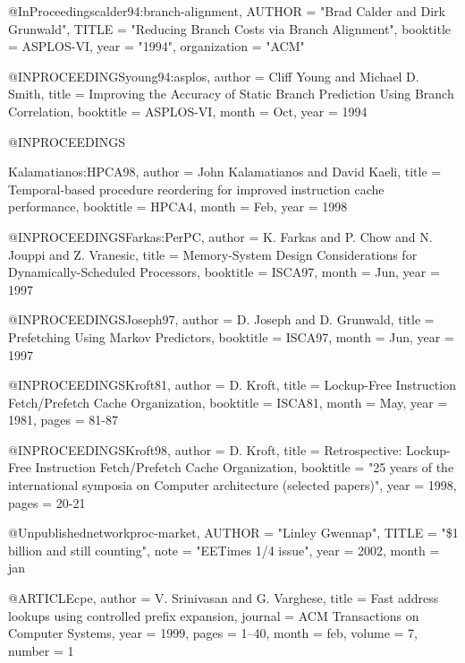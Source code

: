 @InProceedings{calder94:branch-alignment,
AUTHOR = "Brad Calder and Dirk Grunwald",
TITLE = "Reducing Branch Costs via Branch Alignment",
booktitle = ASPLOS-VI,
year =   "1994",
organization = "ACM"
}

@INPROCEEDINGS{young94:asplos,
           author = {Cliff Young and Michael D. Smith},
           title = {Improving the Accuracy of Static Branch Prediction Using Branch  Correlation},
           booktitle = ASPLOS-VI,
           month = Oct,
           year = 1994
}

@INPROCEEDINGS{Kalamatianos:HPCA98,
           author = {John Kalamatianos and David Kaeli},
           title = {Temporal-based procedure reordering for
                   improved instruction cache performance},
           booktitle = HPCA4,
           month = Feb,
           year = 1998

}

@INPROCEEDINGS{Farkas:PerPC,
           author = {K. Farkas and P. Chow and N. Jouppi and Z. Vranesic},
           title = {Memory-System Design Considerations for Dynamically-Scheduled Processors},
           booktitle = ISCA97,
           month = Jun,
           year = 1997
}

@INPROCEEDINGS{Joseph97,
           author = {D. Joseph and D. Grunwald},
           title = {Prefetching Using Markov Predictors},
           booktitle = ISCA97,
           month = Jun,
           year = 1997
}

@INPROCEEDINGS{Kroft81,
           author = {D. Kroft},
           title = {Lockup-Free Instruction Fetch/Prefetch Cache Organization},
           booktitle = ISCA81,
           month = May,
           year = 1981,
           pages = {81-87}
}


@INPROCEEDINGS{Kroft98,
           author = {D. Kroft},
           title = {Retrospective: Lockup-Free Instruction Fetch/Prefetch Cache Organization},
           booktitle = "25 years of the international symposia on Computer architecture (selected papers)",
           year = 1998,
           pages = {20-21}
}



@Unpublished{networkproc-market,
        AUTHOR = "Linley Gwennap",
        TITLE = "\$1 billion and still counting",
        note = "EETimes 1/4 issue",
        year =  2002,
        month = jan
}

@ARTICLE{cpe,
  author =       {V. Srinivasan and G. Varghese},
  title =        {Fast address lookups using controlled prefix expansion},
  journal =      {ACM Transactions on Computer Systems},
  year =         1999,
  pages =        {1--40},
  month =        feb,
  volume = 	 7,
  number = 	 1
}

